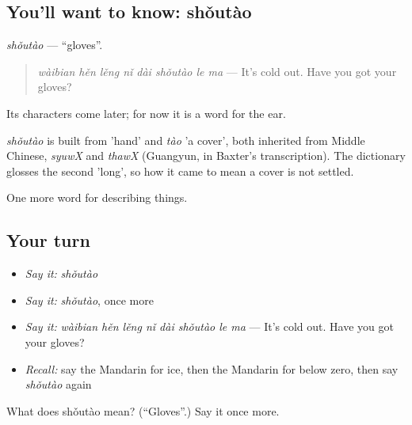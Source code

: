 \subsection*{You'll want to know: shǒutào}
\emph{shǒutào} — \textquotedblleft{}gloves\textquotedblright{}.

\begin{quote}
\emph{wàibian hěn lěng nǐ dài shǒutào le ma} — It's cold out. Have you got your gloves?
\end{quote}

Its characters come later; for now it is a word for the ear.

\begin{cousinweb}
\emph{shǒutào} is built from  'hand' and \emph{tào} 'a cover', both inherited from Middle Chinese, \emph{syuwX} and \emph{thawX} (Guangyun, in Baxter's transcription). The dictionary glosses the second 'long', so how it came to mean a cover is not settled.
\end{cousinweb}

\begin{grammarlens}[title={What you've built}]
One more word for describing things.
\end{grammarlens}

\subsection*{Your turn}
\begin{itemize}
\raggedright
  \item \emph{Say it:} \emph{shǒutào}
  \item \emph{Say it:} \emph{shǒutào}, once more
  \item \emph{Say it:} \emph{wàibian hěn lěng nǐ dài shǒutào le ma} — It's cold out. Have you got your gloves?
  \item \emph{Recall:} say the Mandarin for ice, then the Mandarin for below zero, then say \emph{shǒutào} again
\end{itemize}

\begin{tcolorbox}[breakable,colback=teal!4,colframe=teal!35!black,title={Before you move on}]
What does shǒutào mean? (\textquotedblleft{}Gloves\textquotedblright{}.) Say it once more.
\end{tcolorbox}
